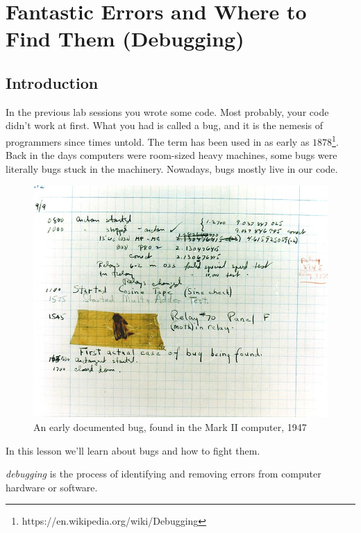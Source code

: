 \chapter{Fantastic Errors and Where to Find Them (Debugging)}

\section{Introduction}

In the previous lab sessions you wrote some code. Most probably, your code didn't work at first. What you had is called a bug, and it is the nemesis of programmers since times untold. The term has been used in as early as $1878$\footnote{https://en.wikipedia.org/wiki/Debugging}. Back in the days computers were room-sized heavy machines, some bugs were literally bugs stuck in the machinery. Nowadays, bugs mostly live in our code.

\begin{figure}[h!]
\centering
\includegraphics[scale=0.5]{lectures/images/bug.jpg}
\caption[An early documented bug, found in the Mark II computer, 1947]{An early documented bug, found in the Mark II computer, 1947\footnotemark}
\end{figure}

In this lesson we'll learn about bugs and how to fight them. 

\begin{definition}
\emph{debugging} is the process of identifying and removing errors from computer hardware or software.
\end{definition}

